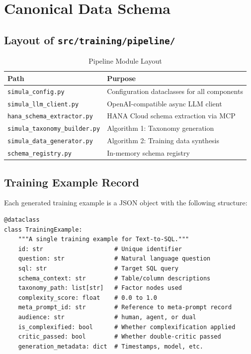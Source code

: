 \chapter{Canonical Data Schema}
\label{chap:schema}\label{sim:chap:schema}

\section{Layout of \texttt{src/training/pipeline/}}

\begin{table}[H]
\centering
\caption{Pipeline Module Layout}
\label{tab:module-layout}
\begin{tabularx}{\textwidth}{lX}
\toprule
\textbf{Path} & \textbf{Purpose} \\
\midrule
\texttt{simula\_config.py} & Configuration dataclasses for all components \\
\texttt{simula\_llm\_client.py} & OpenAI-compatible async LLM client \\
\texttt{hana\_schema\_extractor.py} & HANA Cloud schema extraction via MCP \\
\texttt{simula\_taxonomy\_builder.py} & Algorithm 1: Taxonomy generation \\
\texttt{simula\_data\_generator.py} & Algorithm 2: Training data synthesis \\
\texttt{schema\_registry.py} & In-memory schema registry \\
\bottomrule
\end{tabularx}
\end{table}

\section{Training Example Record}

Each generated training example is a JSON object with the following structure:

\begin{lstlisting}[language=jsonx,caption={TrainingExample dataclass (simula\_data\_generator.py)}]
@dataclass
class TrainingExample:
    """A single training example for Text-to-SQL."""
    id: str                    # Unique identifier
    question: str              # Natural language question
    sql: str                   # Target SQL query
    schema_context: str        # Table/column descriptions
    taxonomy_path: list[str]   # Factor nodes used
    complexity_score: float    # 0.0 to 1.0
    meta_prompt_id: str        # Reference to meta-prompt record
    audience: str              # human, agent, or dual
    is_complexified: bool      # Whether complexification applied
    critic_passed: bool        # Whether double-critic passed
    generation_metadata: dict  # Timestamps, model, etc.
\end{lstlisting}

